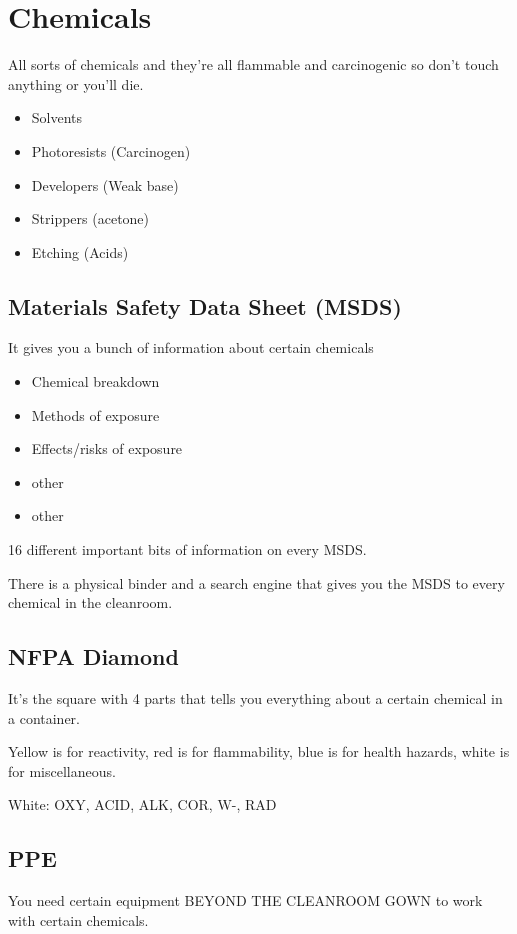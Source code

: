\documentclass[fleqn]{report}
\begin{document}
\chapter{Chemicals}
All sorts of chemicals and they're all flammable and carcinogenic so 
don't touch anything or you'll die.

\begin{itemize}
    \item 
    Solvents
    \item 
    Photoresists (Carcinogen)
    \item 
    Developers (Weak base)
    \item 
    Strippers (acetone)
    \item 
    Etching (Acids)
\end{itemize}

\section{Materials Safety Data Sheet (MSDS)}
It gives you a bunch of information about certain chemicals 

\begin{itemize}
    \item 
    Chemical breakdown
    \item 
    Methods of exposure
    \item 
    Effects/risks of exposure
    \item 
    other 
    \item 
    other 
\end{itemize}

16 different important bits of information on every MSDS. 

There is a physical binder and a search engine that gives you the MSDS 
to every chemical in the cleanroom.

\section{NFPA Diamond}
It's the square with 4 parts that tells you everything about a certain chemical 
in a container.

Yellow is for reactivity, red is for flammability, blue is for health hazards, 
white is for miscellaneous. 

White: OXY, ACID, ALK, COR, W-, RAD 

\section{PPE}
You need certain equipment BEYOND THE CLEANROOM GOWN to work with certain 
chemicals. 
\end{document}
